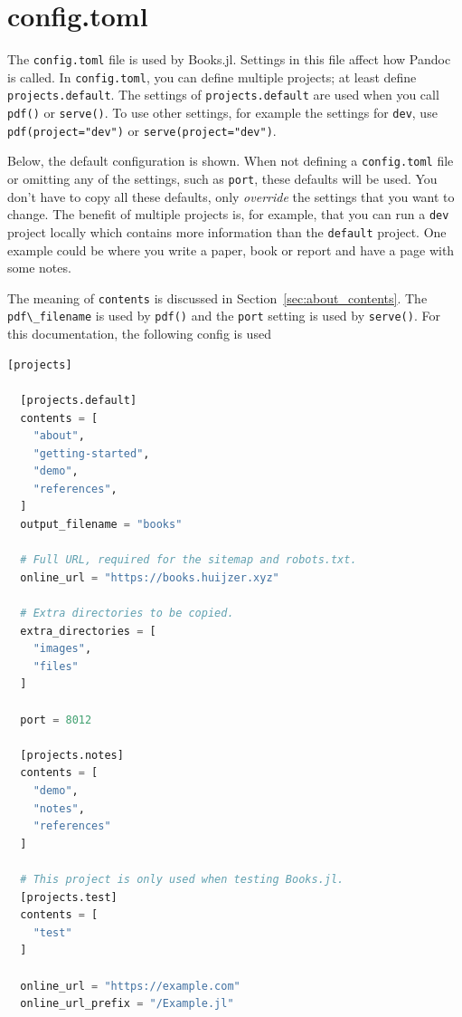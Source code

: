 \documentclass[
  notoc %
]{tufte-book}
\newcommand{\passthrough}[1]{#1}
\begin{document}
\hypertarget{sec:config}{%
\section{config.toml}\label{sec:config}}

The \passthrough{\lstinline!config.toml!} file is used by Books.jl.
Settings in this file affect how Pandoc is called. In
\passthrough{\lstinline!config.toml!}, you can define multiple projects;
at least define \passthrough{\lstinline!projects.default!}. The settings
of \passthrough{\lstinline!projects.default!} are used when you call
\passthrough{\lstinline!pdf()!} or \passthrough{\lstinline!serve()!}. To
use other settings, for example the settings for
\passthrough{\lstinline!dev!}, use
\passthrough{\lstinline!pdf(project="dev")!} or
\passthrough{\lstinline!serve(project="dev")!}.

Below, the default configuration is shown. When not defining a
\passthrough{\lstinline!config.toml!} file or omitting any of the
settings, such as \passthrough{\lstinline!port!}, these defaults will be
used. You don't have to copy all these defaults, only \emph{override}
the settings that you want to change. The benefit of multiple projects
is, for example, that you can run a \passthrough{\lstinline!dev!}
project locally which contains more information than the
\passthrough{\lstinline!default!} project. One example could be where
you write a paper, book or report and have a page with some notes.

The meaning of \passthrough{\lstinline!contents!} is discussed in
Section~\ref{sec:about_contents}. The
\passthrough{\lstinline!pdf\_filename!} is used by
\passthrough{\lstinline!pdf()!} and the \passthrough{\lstinline!port!}
setting is used by \passthrough{\lstinline!serve()!}. For this
documentation, the following config is used

\begin{lstlisting}[language=Julia]
[projects]

  [projects.default]
  contents = [
    "about",
    "getting-started",
    "demo",
    "references",
  ]
  output_filename = "books"

  # Full URL, required for the sitemap and robots.txt.
  online_url = "https://books.huijzer.xyz"

  # Extra directories to be copied.
  extra_directories = [
    "images",
    "files"
  ]

  port = 8012

  [projects.notes]
  contents = [
    "demo",
    "notes",
    "references"
  ]

  # This project is only used when testing Books.jl.
  [projects.test]
  contents = [
    "test"
  ]

  online_url = "https://example.com"
  online_url_prefix = "/Example.jl"


\end{lstlisting}
\end{document}
